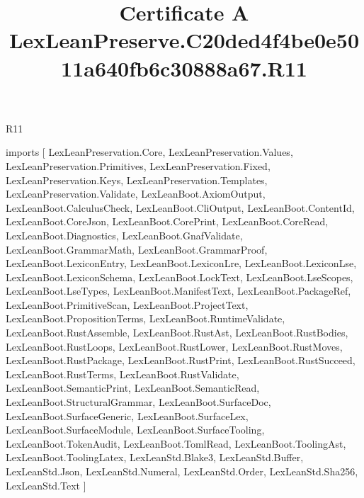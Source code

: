 \begin{lexlean}{R11}
\title{Certificate A LexLeanPreserve.C20ded4f4be0e5011a640fb6c30888a67.R11}
\begin{coremodule}
imports [
  LexLeanPreservation.Core,
  LexLeanPreservation.Values,
  LexLeanPreservation.Primitives,
  LexLeanPreservation.Fixed,
  LexLeanPreservation.Keys,
  LexLeanPreservation.Templates,
  LexLeanPreservation.Validate,
  LexLeanBoot.AxiomOutput,
  LexLeanBoot.CalculusCheck,
  LexLeanBoot.CliOutput,
  LexLeanBoot.ContentId,
  LexLeanBoot.CoreJson,
  LexLeanBoot.CorePrint,
  LexLeanBoot.CoreRead,
  LexLeanBoot.Diagnostics,
  LexLeanBoot.GnafValidate,
  LexLeanBoot.GrammarMath,
  LexLeanBoot.GrammarProof,
  LexLeanBoot.LexiconEntry,
  LexLeanBoot.LexiconLre,
  LexLeanBoot.LexiconLse,
  LexLeanBoot.LexiconSchema,
  LexLeanBoot.LockText,
  LexLeanBoot.LseScopes,
  LexLeanBoot.LseTypes,
  LexLeanBoot.ManifestText,
  LexLeanBoot.PackageRef,
  LexLeanBoot.PrimitiveScan,
  LexLeanBoot.ProjectText,
  LexLeanBoot.PropositionTerms,
  LexLeanBoot.RuntimeValidate,
  LexLeanBoot.RustAssemble,
  LexLeanBoot.RustAst,
  LexLeanBoot.RustBodies,
  LexLeanBoot.RustLoops,
  LexLeanBoot.RustLower,
  LexLeanBoot.RustMoves,
  LexLeanBoot.RustPackage,
  LexLeanBoot.RustPrint,
  LexLeanBoot.RustSucceed,
  LexLeanBoot.RustTerms,
  LexLeanBoot.RustValidate,
  LexLeanBoot.SemanticPrint,
  LexLeanBoot.SemanticRead,
  LexLeanBoot.StructuralGrammar,
  LexLeanBoot.SurfaceDoc,
  LexLeanBoot.SurfaceGeneric,
  LexLeanBoot.SurfaceLex,
  LexLeanBoot.SurfaceModule,
  LexLeanBoot.SurfaceTooling,
  LexLeanBoot.TokenAudit,
  LexLeanBoot.TomlRead,
  LexLeanBoot.ToolingAst,
  LexLeanBoot.ToolingLatex,
  LexLeanStd.Blake3,
  LexLeanStd.Buffer,
  LexLeanStd.Json,
  LexLeanStd.Numeral,
  LexLeanStd.Order,
  LexLeanStd.Sha256,
  LexLeanStd.Text
]


\end{coremodule}
\end{lexlean}
